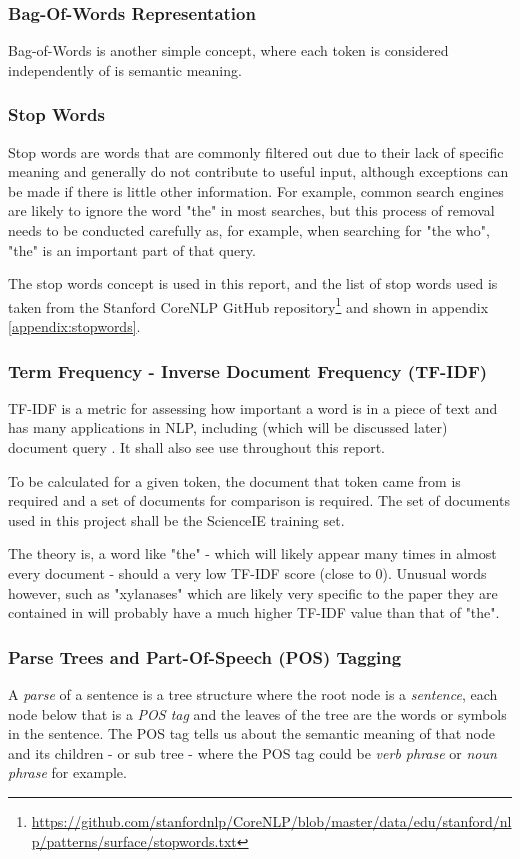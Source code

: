 \subsubsection*{Bag-Of-Words Representation}
Bag-of-Words is another simple concept, where each token is considered independently of is semantic meaning. 

\subsubsection*{Stop Words}
Stop words are words that are commonly filtered out due to their lack of specific meaning and generally do not contribute to useful input, although exceptions can be made if there is little other information. For example, common search engines are likely to ignore the word "the" in most searches, but this process of removal needs to be conducted carefully as, for example, when searching for "the who", "the" is an important part of that query. 

The stop words concept is used in this report, and the list of stop words used is taken from the Stanford CoreNLP GitHub repository\footnote{\href{https://github.com/stanfordnlp/CoreNLP/blob/master/data/edu/stanford/nlp/patterns/surface/stopwords.txt}{https://github.com/stanfordnlp/CoreNLP/blob/master/data/edu/stanford/nlp/patterns/surface/stopwords.txt}} and shown in appendix \ref{appendix:stopwords}.

\subsubsection*{Term Frequency - Inverse Document Frequency (TF-IDF)}
TF-IDF is a metric for assessing how important a word is in a piece of text and has many applications in NLP, including (which will be discussed later) document query \cite{Ramos2003}. It shall also see use throughout this report.

To be calculated for a given token, the document that token came from is required and a set of documents for comparison is required. The set of documents used in this project shall be the ScienceIE training set.

The theory is, a word like "the" - which will likely appear many times in almost every document - should a very low TF-IDF score (close to 0). Unusual words however, such as "xylanases" which are likely very specific to the paper they are contained in will probably have a much higher TF-IDF value than that of "the".

\subsubsection*{Parse Trees and Part-Of-Speech (POS) Tagging}
A \textit{parse} of a sentence is a tree structure where the root node is a \textit{sentence}, each node below that is a \textit{POS tag} and the leaves of the tree are the words or symbols in the sentence. The POS tag tells us about the semantic meaning of that node and its children - or sub tree - where the POS tag could be \textit{verb phrase} or \textit{noun phrase} for example.

